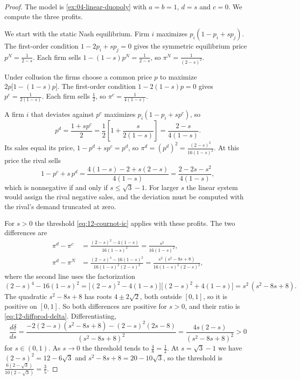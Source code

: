 \begin{proof}
The model is \cref{ex:04-linear-duopoly} with $a = b = 1$, $d = s$ and $c = 0$. We compute the three profits.

We start with the static Nash equilibrium. Firm $i$ maximizes $p_i(1 - p_i + sp_j)$. The first-order condition
$1 - 2p_i + sp_j = 0$ gives the symmetric equilibrium price $p^N = \frac{1}{2 - s}$. Each firm sells
$1 - (1 - s)p^N = \frac{1}{2 - s}$, so $\pi^N = \frac{1}{(2 - s)^2}$.

Under collusion the firms choose a common price $p$ to maximize $2p\bigl[1 - (1 - s)p\bigr]$. The first-order
condition $1 - 2(1 - s)p = 0$ gives $p^c = \frac{1}{2(1 - s)}$. Each firm sells $\frac{1}{2}$, so
$\pi^c = \frac{1}{4(1 - s)}$.

A firm $i$ that deviates against $p^c$ maximizes $p_i(1 - p_i + sp^c)$, so
\begin{equation*}
p^d = \frac{1 + sp^c}{2} = \frac{1}{2}\left[1 + \frac{s}{2(1 - s)}\right] = \frac{2 - s}{4(1 - s)} .
\end{equation*}
Its sales equal its price, $1 - p^d + sp^c = p^d$, so $\pi^d = (p^d)^2 = \frac{(2 - s)^2}{16(1 - s)^2}$. At this
price the rival sells
\begin{equation*}
1 - p^c + s\,p^d = \frac{4(1 - s) - 2 + s(2 - s)}{4(1 - s)} = \frac{2 - 2s - s^2}{4(1 - s)} ,
\end{equation*}
which is nonnegative if and only if $s \le \sqrt 3 - 1$. For larger $s$ the linear system would assign the rival
negative sales, and the deviation must be computed with the rival's demand truncated at zero.

For $s > 0$ the threshold \eqref{eq:12-cournot-ic} applies with these profits. The two differences are
\begin{align*}
\pi^d - \pi^c &= \frac{(2 - s)^2 - 4(1 - s)}{16(1 - s)^2} = \frac{s^2}{16(1 - s)^2} , \\
\pi^d - \pi^N &= \frac{(2 - s)^4 - 16(1 - s)^2}{16(1 - s)^2(2 - s)^2}
= \frac{s^2\,(s^2 - 8s + 8)}{16(1 - s)^2(2 - s)^2} ,
\end{align*}
where the second line uses the factorization
\begin{equation*}
(2 - s)^4 - 16(1 - s)^2 = \bigl[(2 - s)^2 - 4(1 - s)\bigr]\bigl[(2 - s)^2 + 4(1 - s)\bigr] = s^2\,(s^2 - 8s + 8) .
\end{equation*}
The quadratic $s^2 - 8s + 8$ has roots $4 \pm 2\sqrt 2$, both outside $[0, 1]$, so it is
positive on $[0, 1]$. So both differences are positive for $s > 0$, and their ratio is \eqref{eq:12-diffprod-delta}.
Differentiating,
\begin{equation*}
\frac{d\underline\delta}{ds}
= \frac{-2(2 - s)(s^2 - 8s + 8) - (2 - s)^2(2s - 8)}{(s^2 - 8s + 8)^2}
= \frac{4s(2 - s)}{(s^2 - 8s + 8)^2} > 0
\end{equation*}
for $s \in (0, 1)$. As $s \to 0$ the threshold tends to $\frac{4}{8} = \frac{1}{2}$. At $s = \sqrt 3 - 1$ we have
$(2 - s)^2 = 12 - 6\sqrt 3$ and $s^2 - 8s + 8 = 20 - 10\sqrt 3$, so the threshold is
$\frac{6(2 - \sqrt 3)}{10(2 - \sqrt 3)} = \frac{3}{5}$.


\end{proof}
